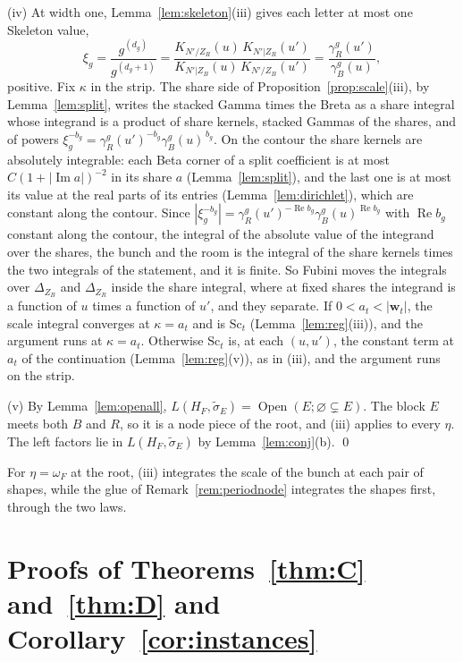 \documentclass[11pt]{article}
\theoremstyle{plain}
\theoremstyle{definition}
\theoremstyle{remark}
\newcommand{\Open}{\operatorname{Open}}
\newcommand{\tsig}{\widetilde\sigma}
\DeclareMathOperator{\re}{Re}
\DeclareMathOperator{\im}{Im}
\begin{document}
(iv) At width one, Lemma~\ref{lem:skeleton}(iii) gives each letter at most one Skeleton value,
\[
\xi_g=\frac{g^{(d_g)}}{g^{(d_g+1)}}=\frac{K_{N'/Z_R}(u)\,K_{N'|Z_R}(u')}{K_{N'|Z_B}(u)\,K_{N'/Z_B}(u')}=\frac{\gamma^g_R(u')}{\gamma^g_B(u)} ,
\]
positive. Fix $\kappa$ in the strip. The share side of Proposition~\ref{prop:scale}(iii), by Lemma~\ref{lem:split}, writes the stacked Gamma times the Breta as a share integral whose integrand is a product of share kernels, stacked Gammas of the shares, and of powers $\xi_g^{-b_g}=\gamma^g_R(u')^{-b_g}\gamma^g_B(u)^{\,b_g}$. On the contour the share kernels are absolutely integrable: each Beta corner of a split coefficient is at most $C(1+|\im a|)^{-2}$ in its share $a$ (Lemma~\ref{lem:split}), and the last one is at most its value at the real parts of its entries (Lemma~\ref{lem:dirichlet}), which are constant along the contour. Since $|\xi_g^{-b_g}|=\gamma^g_R(u')^{-\re b_g}\gamma^g_B(u)^{\re b_g}$ with $\re b_g$ constant along the contour, the integral of the absolute value of the integrand over the shares, the bunch and the room is the integral of the share kernels times the two integrals of the statement, and it is finite. So Fubini moves the integrals over $\Delta_{Z_B}$ and $\Delta_{Z_R}$ inside the share integral, where at fixed shares the integrand is a function of $u$ times a function of $u'$, and they separate. If $0<a_t<|\mathbf w_t|$, the scale integral converges at $\kappa=a_t$ and is $\mathrm{Sc}_t$ (Lemma~\ref{lem:reg}(iii)), and the argument runs at $\kappa=a_t$. Otherwise $\mathrm{Sc}_t$ is, at each $(u,u')$, the constant term at $a_t$ of the continuation (Lemma~\ref{lem:reg}(v)), as in (iii), and the argument runs on the strip.

(v) By Lemma~\ref{lem:openall}, $L(H_F,\tsig_E)=\Open(E;\varnothing\subsetneq E)$. The block $E$ meets both $B$ and $R$, so it is a node piece of the root, and (iii) applies to every $\eta$. The left factors lie in $L(H_F,\tsig_E)$ by Lemma~\ref{lem:conj}(b). \qed

For $\eta=\omega_F$ at the root, (iii) integrates the scale of the bunch at each pair of shapes, while the glue of Remark~\ref{rem:periodnode} integrates the shapes first, through the two laws.

\section{Proofs of Theorems~\ref{thm:C} and~\ref{thm:D} and Corollary~\ref{cor:instances}}\label{sec:proofCD}
\end{document}
